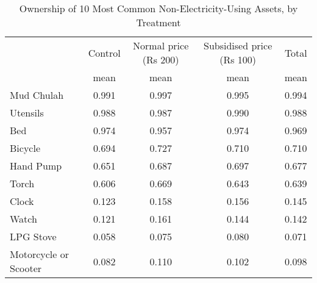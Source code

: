 \begin{table}[htbp]\centering
\def\sym#1{\ifmmode^{#1}\else\(^{#1}\)\fi}
\caption{Ownership of 10 Most Common Non-Electricity-Using Assets, by Treatment \label{tab:"label"}}
\begin{tabular*}{0.9\hsize}{@{\hskip\tabcolsep\extracolsep\fill}l*{4}{c}}
\toprule
                                &  Control&Normal price (Rs 200)&Subsidised price (Rs 100)&    Total\\
                                &     mean&     mean&     mean&     mean\\
\midrule
Mud Chulah                      &    0.991&    0.997&    0.995&    0.994\\
Utensils                        &    0.988&    0.987&    0.990&    0.988\\
Bed                             &    0.974&    0.957&    0.974&    0.969\\
Bicycle                         &    0.694&    0.727&    0.710&    0.710\\
Hand Pump                       &    0.651&    0.687&    0.697&    0.677\\
Torch                           &    0.606&    0.669&    0.643&    0.639\\
Clock                           &    0.123&    0.158&    0.156&    0.145\\
Watch                           &    0.121&    0.161&    0.144&    0.142\\
LPG Stove                       &    0.058&    0.075&    0.080&    0.071\\
Motorcycle or Scooter           &    0.082&    0.110&    0.102&    0.098\\
\bottomrule
\end{tabular*}
\end{table}
